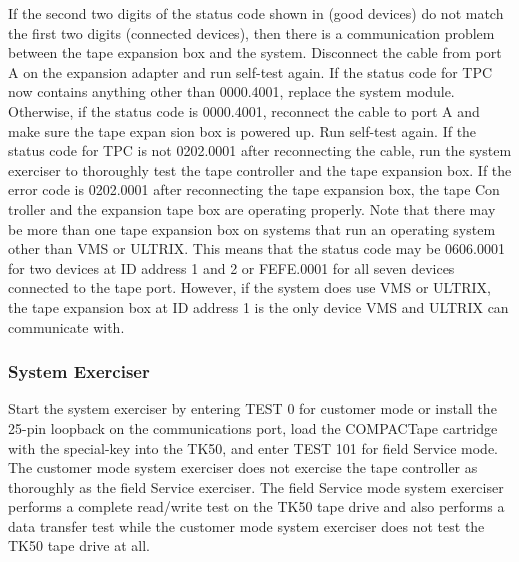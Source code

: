 If the second two digits of the status code shown in  (good
devices) do not match the first two digits (connected devices), then there
is a communication problem between the tape expansion box and the system. 
Disconnect the cable from port A on the expansion adapter and run
self-test again. If the status code for TPC now contains anything other than
0000.4001, replace the system module. Otherwise, if the status code is
0000.4001, reconnect the cable to port A and make sure the tape expan
sion box is powered up. Run self-test again. If the status code for TPC
is not 0202.0001 after reconnecting the cable, run the system exerciser to
thoroughly test the tape controller and the tape expansion box. If the error
code is 0202.0001 after reconnecting the tape expansion box, the tape Con
troller and the expansion tape box are operating properly. Note that there
may be more than one tape expansion box on systems that run an operating
system other than VMS or ULTRIX. This means that the status code may be
0606.0001 for two devices at ID address 1 and 2 or FEFE.0001 for all seven
devices connected to the tape port. However, if the system does use VMS
or ULTRIX, the tape expansion box at ID address 1 is the only device VMS
and ULTRIX can communicate with.

\subsubsection{System Exerciser}

Start the system exerciser by entering TEST 0 for customer mode or install
the 25-pin loopback on the communications port, load the COMPACTape
cartridge with the special-key into the TK50, and enter TEST 101 for field
Service mode. The customer mode system exerciser does not exercise the
tape controller as thoroughly as the field Service exerciser. The field Service
mode system exerciser performs a complete read/write test on the TK50
tape drive and also performs a data transfer test while the customer mode
system exerciser does not test the TK50 tape drive at all.

